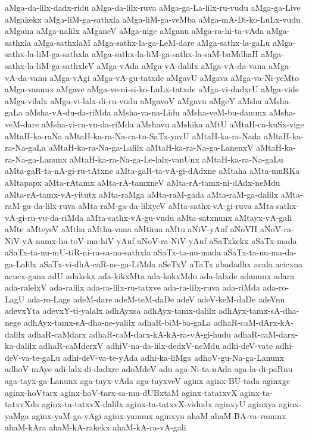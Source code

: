 {aMga-da-lilx-dadx-ridu
aMga-da-lilx-ruva
aMga-ga-La-lilx-ru-vudu
aMga-ga-Live
aMgakekx
aMga-liM-ga-sathxla
aMga-liM-ga-veMba
aMga-mA-Di-ko-LuLx-vudu
aMgana
aMga-nalilx
aMganeV
aMga-nige
aMganu
aMga-ra-hi-ta-vAda
aMga-sathxla
aMga-sathxlaM
aMga-sathx-la-ga-LeM-dare
aMga-sathx-la-gaLu
aMga-sathx-la-liM-ga-sathxla
aMga-sathx-la-liM-ga-sathx-la-saM-baMdhaH
aMga-sathx-la-liM-ga-sathxleV
aMga-vAda
aMga-vA-dalilx
aMga-vA-da-vana
aMga-vA-da-vanu
aMga-vAgi
aMga-vA-gu-tatxde
aMgavU
aMgava
aMga-va-Ni-yeMto
aMga-vanunx
aMgave
aMga-ve-ni-si-ko-LuLx-tatxde
aMga-vi-dadxrU
aMga-vide
aMga-vilalx
aMga-vi-lalx-di-ru-vudu
aMgavoV
aMgavu
aMgeY
aMsha
aMsha-gaLa
aMsha-vA-du-da-riMda
aMsha-va-na-Lidu
aMsha-veM-bu-danunx
aMsha-veM-dare
aMsha-vi-ru-vu-da-riMda
aMshavu
aMshika
aMtU
aMtaH-ca-kuSx-vige
aMtaH-ka-raNa
aMtaH-ka-ra-Na-ca-tu-SaTx-yavU
aMtaH-ka-ra-Nada
aMtaH-ka-ra-Na-gaLa
aMtaH-ka-ra-Na-ga-Lalilx
aMtaH-ka-ra-Na-ga-LanenxV
aMtaH-ka-ra-Na-ga-Lanunx
aMtaH-ka-ra-Na-ga-Le-lalx-vanUnx
aMtaH-ka-ra-Na-gaLu
aMta-gaR-ta-nA-gi-ru-tAtxne
aMta-gaR-ta-vA-gi-dAdxne
aMtaha
aMta-muRKa
aMtapapx
aMta-rAtamx
aMta-rA-tamxneV
aMta-rA-tamx-ni-dAdx-neMdu
aMta-rA-tamx-vA-yitutx
aMta-raMga
aMta-raM-gada
aMta-raM-ga-dalilx
aMta-raM-ga-da-lilx-ruva
aMta-raM-ga-da-lilxyeV
aMta-sathx-vA-gi-ruva
aMta-sathx-vA-gi-ru-vu-da-riMda
aMta-sathx-vA-gu-vudu
aMta-satxnunx
aMtayx-vA-gali
aMte
aMteyeV
aMtha
aMtha-vana
aMtima
aMtu
aNiV-yAnf
aNoVH
aNoV-ra-NiV-yA-namx-ha-toV-ma-hiV-yAnf
aNoV-ra-NiV-yAnf
aSaTxkekx
aSaTx-mada
aSaTx-ta-nu-mU-tiR-ni-ra-sa-na-sathxla
aSaTx-ta-nu-mada
aSaTx-ta-nu-ma-da-ga-Lalilx
aSaTx-vi-dhA-caR-ne-ga-LiMda
aSeTxV
aTaTx
abadadhx
acala
acicxna
acucx-gana
adU
adakekx
ada-kikxMta
ada-kokxMdu
ada-lalxde
adanunx
adara
ada-ralelxV
ada-ralilx
ada-ra-lilx-ru-tatxve
ada-ra-lilx-ruva
ada-riMda
ada-ro-LagU
ada-ro-Lage
adeM-dare
adeM-teM-daDe
adeV
adeV-keM-daDe
adeVnu
adevxYta
adevxY-ti-yalalx
adhAyxsa
adhAyx-tamx-dalilx
adhAyx-tamx-sA-dha-nege
adhAyx-tamx-sA-dha-ne-yalilx
adhaR-biM-ba-gaLa
adhaR-caM-dArx-kA-dalilx
adhaR-caMdarx
adhaR-caM-darx-kA-kA-ra-vA-gi-hudu
adhaR-caM-darx-ka-dalilx
adhaR-caMderxV
adhiV-na-da-lilx-dedxV-neMdu
adhi-deV-vate
adhi-deV-va-te-gaLu
adhi-deV-va-te-yAda
adhi-ka-liMga
adhoV-gu-Na-ga-Lanunx
adhoV-mAye
adi-lalx-di-dadxre
adoMdeV
adu
aga-Ni-ta-nAda
aga-la-di-paRnu
aga-tayx-ga-Lanunx
aga-tayx-vAda
aga-tayxveV
aginx
aginx-BU-tada
aginxge
aginx-hoVtarx
aginx-hoV-tarx-sa-mu-dUBxtaM
aginx-tatatxvX
aginx-ta-tatxvXda
aginx-ta-tatxvX-dalilx
aginx-ta-tatxvX-vidudx
aginxyU
aginxya
aginx-yaMga
aginx-yaM-ga-vAgi
aginx-yanunx
aginxyu
ahaM
ahaM-BA-va-vanunx
ahaM-kAra
ahaM-kA-rakekx
ahaM-kA-ra-vA-gali
}

